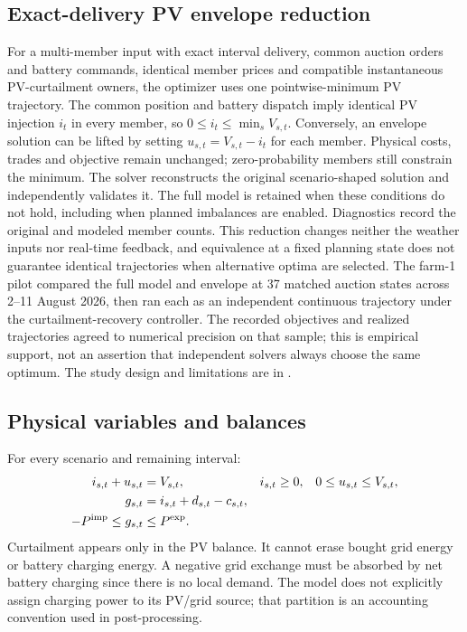 \documentclass[11pt,a4paper]{article}
\begin{document}
\subsection{Exact-delivery PV envelope reduction}
For a multi-member input with exact interval delivery, common auction
orders and battery commands, identical member prices and compatible instantaneous
PV-curtailment owners, the optimizer uses one pointwise-minimum PV trajectory.
The common position and battery dispatch imply identical PV injection $i_t$ in
every member, so $0\le i_t\le\min_s V_{s,t}$. Conversely, an envelope solution
can be lifted by setting $u_{s,t}=V_{s,t}-i_t$ for each member. Physical costs,
trades and objective remain unchanged; zero-probability members still constrain
the minimum. The solver reconstructs the original scenario-shaped solution and
independently validates it. The full model is retained when these conditions do
not hold, including when planned imbalances are enabled. Diagnostics record the
original and modeled member counts. This reduction changes neither the weather
inputs nor real-time feedback, and equivalence at a fixed planning state does
not guarantee identical trajectories when alternative optima are selected.
The farm-1 pilot compared the full model and envelope at 37 matched auction
states across 2--11 August 2026, then ran each as an independent continuous
trajectory under the curtailment-recovery controller. The recorded objectives
and realized trajectories agreed to numerical precision on that sample; this is
empirical support, not an assertion that independent solvers always choose the
same optimum. The study design and limitations are in
.

\subsection{Physical variables and balances}
For every scenario and remaining interval:
\begin{align}
 i_{s,t}+u_{s,t}&=V_{s,t}, & i_{s,t}&\ge0, & 0\le u_{s,t}&\le V_{s,t},\label{eq:pvbalance}\\
 g_{s,t}&=i_{s,t}+d_{s,t}-c_{s,t},\label{eq:bus}\\
 -P^{\rm imp}\le g_{s,t}&\le P^{\rm exp}.\label{eq:poi}
\end{align}
Curtailment appears only in the PV balance. It cannot erase bought grid energy
or battery charging energy. A negative grid exchange must be absorbed by net
battery charging since there is no local demand. The model does not explicitly
assign charging power to its PV/grid source; that partition is an accounting
convention used in post-processing.
\end{document}
